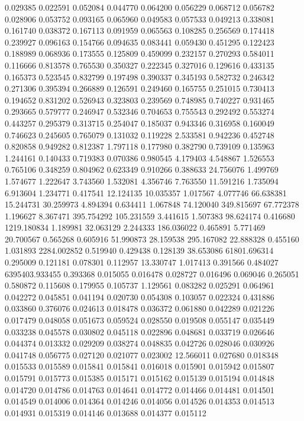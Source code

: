 0.029385
0.022591
0.052084
0.044770
0.064200
0.056229
0.068712
0.056782
0.028906
0.053752
0.093165
0.065960
0.049583
0.057533
0.049213
0.338081
0.161740
0.038372
0.167113
0.091959
0.065563
0.108285
0.256569
0.174418
0.239927
0.096163
0.154766
0.094635
0.083441
0.059430
0.451295
0.122423
0.188989
0.068936
0.173555
0.125809
0.459099
0.232157
0.270293
0.584011
0.116666
0.813578
0.765530
0.350327
0.222345
0.327016
0.129616
0.433135
0.165373
0.523545
0.832799
0.197498
0.390337
0.345193
0.582732
0.246342
0.271306
0.395394
0.266889
0.126591
0.249460
0.165755
0.251015
0.730413
0.194652
0.831202
0.526943
0.323803
0.239569
0.748985
0.740227
0.931465
0.293665
0.579777
0.246947
0.532346
0.704653
0.755543
0.292492
0.553274
0.443257
0.295379
0.313715
0.254047
0.185037
0.943346
0.316958
0.160049
0.746623
0.245605
0.765079
0.131032
0.119228
2.533581
0.942236
0.452748
0.820858
0.949282
0.812387
1.797118
0.177980
0.382790
0.739109
0.135963
1.244161
0.140433
0.719383
0.070386
0.980545
4.179403
4.548867
1.526553
0.765106
0.348259
0.804962
0.623349
0.910266
0.388633
24.756076
1.499769
1.574677
1.222647
3.743560
1.532081
4.356746
7.763550
11.591216
1.735094
6.913604
1.234771
0.417541
12.124135
10.035357
1.017567
4.077746
66.638381
15.244731
30.259973
4.894394
0.634411
1.067848
74.120040
349.815697
67.772378
1.196627
8.367471
395.754292
105.231559
3.441615
1.507383
98.624174
0.416680
1219.180834
1.189981
32.063129
2.244333
186.036022
0.465891
5.771469
20.700567
0.565268
0.605916
51.990873
28.159538
295.167082
22.888328
0.455160
1.031893
2284.002852
0.519940
0.429438
0.128139
38.653086
61801.696314
0.295009
0.121181
0.078301
0.112957
13.330747
1.017413
0.391566
0.484027
6395403.933455
0.393368
0.015055
0.016478
0.028727
0.016496
0.069046
0.265051
0.580872
0.115608
0.179955
0.105737
1.129561
0.083282
0.025291
0.064961
0.042272
0.045851
0.041194
0.020730
0.054308
0.103057
0.022324
0.431886
0.033860
0.376076
0.024613
0.018478
0.036372
0.061880
0.042289
0.021226
0.017479
0.048058
0.051673
0.059524
0.028550
0.019508
0.055147
0.035449
0.033238
0.045578
0.030802
0.045118
0.022896
0.048681
0.033719
0.026646
0.044374
0.013332
0.029209
0.038274
0.048835
0.042726
0.028046
0.030926
0.041748
0.056775
0.027120
0.021077
0.023002
12.566011
0.027680
0.018348
0.015533
0.015589
0.015841
0.015841
0.016018
0.015901
0.015942
0.015807
0.015791
0.015773
0.015385
0.015171
0.015162
0.015139
0.015194
0.014848
0.014720
0.014786
0.014763
0.014641
0.014772
0.014466
0.014481
0.014501
0.014549
0.014006
0.014364
0.014246
0.014056
0.014526
0.014353
0.014513
0.014931
0.015319
0.014146
0.013688
0.014377
0.015112
